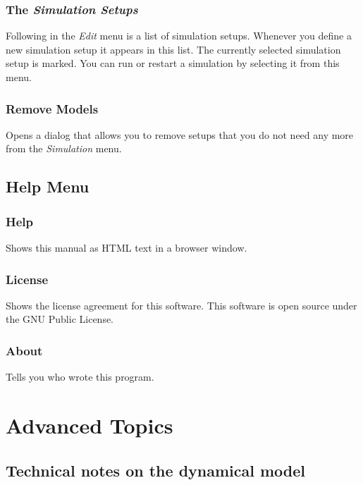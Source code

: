 \documentclass[12pt,a4paper,USenglish]{article}
\begin{document}
\subsubsection{The \emph{Simulation Setups}}

Following in the \emph{Edit} menu is a list of simulation setups.
Whenever you define a new simulation setup it appears in this list.
The currently selected simulation setup is marked. You can run or
restart a simulation by selecting it from this menu.


\subsubsection{Remove Models}

Opens a dialog that allows you to remove setups that you do not need
any more from the \emph{Simulation} menu.


\subsection{Help Menu}

\subsubsection{Help}

Shows this manual as HTML text in a browser window.

\subsubsection{License}

Shows the license agreement for this software. This software is open
source under the GNU Public License.

\subsubsection{About}

Tells you who wrote this program.


\section{Advanced Topics}

\subsection{Technical notes on the dynamical model}
\end{document}
